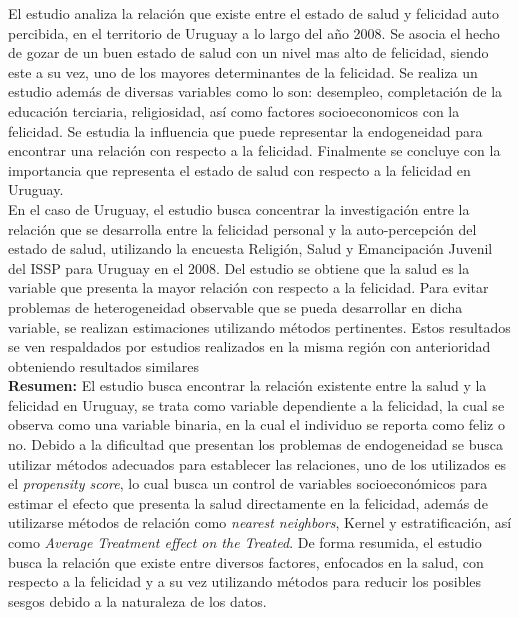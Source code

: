 El estudio analiza la relación que existe entre el estado de salud y felicidad auto percibida, en el territorio de Uruguay a lo largo del año 2008. Se asocia el hecho de gozar de un buen estado de salud con un nivel mas alto de felicidad, siendo este a su vez, uno de los mayores determinantes de la felicidad. Se realiza un estudio además de diversas variables como lo son: desempleo, completación de la educación terciaria, religiosidad, así como factores socioeconomicos con la felicidad. Se estudia la influencia que puede representar la endogeneidad para encontrar una relación con respecto a la felicidad. Finalmente se concluye con la importancia que representa el estado de salud con respecto a la felicidad en Uruguay. \\

En el caso de Uruguay, el estudio busca concentrar la investigación entre la relación que se desarrolla entre la felicidad personal y la auto-percepción del estado de salud, utilizando la encuesta Religión, Salud y Emancipación Juvenil del ISSP para Uruguay en el 2008. Del estudio se obtiene que la salud es la variable que presenta la mayor relación con respecto a la felicidad. Para evitar problemas de heterogeneidad observable que se pueda desarrollar en dicha variable, se realizan estimaciones utilizando métodos pertinentes. Estos resultados se ven respaldados por estudios realizados en la misma región con anterioridad obteniendo resultados similares\\

\textbf{Resumen:} El estudio busca encontrar la relación existente entre la salud y la felicidad en Uruguay, se trata como variable dependiente a la felicidad, la cual se observa como una variable binaria, en la cual el individuo se reporta como feliz o no. Debido a la dificultad que presentan los problemas de endogeneidad se busca utilizar métodos adecuados para establecer las relaciones, uno de los utilizados es el \textit{propensity score}, lo cual busca un control de variables socioeconómicos para estimar el efecto que presenta la salud directamente en la felicidad, además de utilizarse métodos de relación como \textit{nearest neighbors}, Kernel y estratificación, así como \textit{Average Treatment effect on the Treated}. De forma resumida, el estudio busca la relación que existe entre diversos factores, enfocados en la salud, con respecto a la felicidad y a su vez utilizando métodos para reducir los posibles sesgos debido a la naturaleza de los datos.\\

